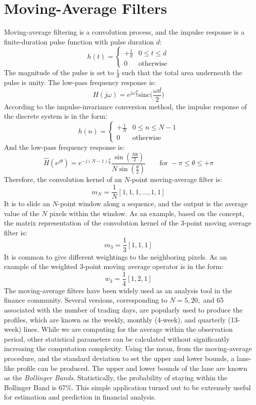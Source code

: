 \documentclass{article}
\begin{document}
\section{Moving-Average Filters}
Moving-average filtering is a convolution process, and the impulse response is a finite-duration pulse function with pulse duration \(d\):
\[
h(t)=
\begin{cases}
+\frac{1}{d} & 0\leq t\leq d\\
0 & \text{otherwise}
\end{cases}
\]
The magnitude of the pulse is set to \(\frac{1}{d}\) such that the total area underneath the pulse is unity. The low-pass frequency response is:
\[
H(j\omega)=e^{j\omega\frac{d}{2}}\mathrm{sinc}\bigg(\frac{\omega d}{2}\bigg)
\]
According to the impulse-invariance conversion method, the impulse response of the discrete system is in the form:
\[
h(n)=
\begin{cases}
+\frac{1}{N}&0\leq n\leq N-1\\
0&\text{otherwise}
\end{cases}
\]
And the low-pass frequency response is:
\[
\hat{H}(e^{j\theta})=e^{-j(N-1)\frac{\theta}{2}}\frac{\sin(\frac{N\theta}{2})}{N\sin(\frac{\theta}{2})} \qquad \text{for }-\pi\leq\theta\leq+\pi
\]
Therefore, the convolution kernel of an \(N\)-point moving-average filter is:
\[
m_N=\frac{1}{N}[1,1,1,\dots,1,1]
\]
It is to slide an \(N\)-point window along a sequence, and the output is the average value of the \(N\) pixels within the window. As an example, based on the concept, the matrix representation of the convolution kernel of the 3-point moving average filter is:
\[
m_3=\frac{1}{3}[1,1,1]
\]
It is common to give different weightings to the neighboring pixels. As an example of the weighted 3-point moving average operator is in the form:
\[
w_3=\frac{1}{4}[1,2,1]
\]
The moving-average filters have been widely used as an analysis tool in the finance community. Several versions, corresponding to \(N=5,20,\) and 65 associated with the number of trading days, are popularly used to produce the profiles, which are known as the weekly, monthly (4-week), and quarterly (13-week) lines. While we are computing for the average within the observation period, other statistical parameters can be calculated without significantly increasing the computation complexity. Using the mean, from the moving-average procedure, and the standard deviation to set the upper and lower bounds, a lane-like profile can be produced. The upper and lower bounds of the lane are known as the \textit{Bollinger Bands}. Statistically, the probability of staying within the Bollinger Band is 67\%. This simple application turned out to be extremely useful for estimation and prediction in financial analysis.
\end{document}
